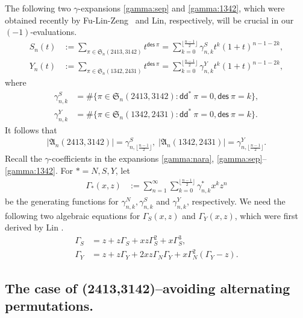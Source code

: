 \documentclass[12pt,reqno]{amsart}
\numberwithin{equation}{section}
\theoremstyle{plain}
\theoremstyle{definition}
\def\S{\mathfrak{S}}
\def\A{\mathfrak{A}}
\def\dd{\mathsf{dd}}
\def\des{\mathsf{des}}
\begin{document}
The following two $\gamma$-expansions
 \eqref{gamma:sep} and \eqref{gamma:1342}, which  were  obtained recently by Fu-Lin-Zeng~\cite{FLZ} and  Lin\cite{Lin17}, respectively, will be crucial in our $(-1)$-evaluations.
 \begin{align}
 \label{gamma:sep}
S_n(t) &:=\sum_{\pi\in\S_n(2413,3142)}t^{\des\:\pi} =\sum_{k= 0}^{\lfloor\frac{n-1}{2}\rfloor}\gamma_{n,k}^S t^k (1+t)^{n-1-2k},\\
\label{gamma:1342}
Y_n(t) &:=\sum_{\pi\in\S_n(1342,2431)}t^{\des\:\pi} =\sum_{k= 0}^{\lfloor\frac{n-1}{2}\rfloor}\gamma_{n,k}^Y t^k (1+t)^{n-1-2k},
\end{align}
where
\begin{align}
\label{comb:sep}
\gamma_{n,k}^S &=\#\{\pi \in \S_n(2413, 3142): \dd^*\:\pi=0, \des\:\pi=k\},\\
\label{comb:1342}
\gamma_{n,k}^Y &=\#\{\pi \in \S_n(1342, 2431): \dd^*\:\pi=0, \des\:\pi=k\}.
\end{align}
It follows that
\begin{align}\label{alt-4=gamma}
|\A_n(2413,3142)|=\gamma_{n,\lfloor\frac{n-1}{2}\rfloor}^S,\; |\A_n(1342,2431)|=\gamma_{n,\lfloor\frac{n-1}{2}\rfloor}^Y.
\end{align}
Recall the $\gamma$-coefficients in the expansions \eqref{gamma:nara}, \eqref{gamma:sep}--\eqref{gamma:1342}. For $*=N,S,Y$, let
\begin{align*}
\Gamma_*(x,z)&:=\sum_{n=1}^{\infty}\sum_{k=0}^{\lfloor\frac{n-1}{2}\rfloor}\gamma^*_{n,k}x^kz^n
\end{align*}
be the generating functions for $\gamma^N_{n,k},\gamma^S_{n,k}$ and $\gamma^Y_{n,k}$, respectively. We need the following two algebraic equations for $\Gamma_S(x,z)$ and $\Gamma_Y(x,z)$, which were first derived by Lin \cite{Lin17}.
\begin{align}\label{ae-sep}
\Gamma_S&=z+z\Gamma_S+xz\Gamma^2_S+x\Gamma^3_S,\\
\label{ae-1342}
\Gamma_Y&=z+z\Gamma_Y+2xz\Gamma_N\Gamma_Y+x\Gamma^2_N(\Gamma_Y-z).
\end{align}


\subsection{The case of (2413,3142)--avoiding alternating permutations.}
\end{document}
